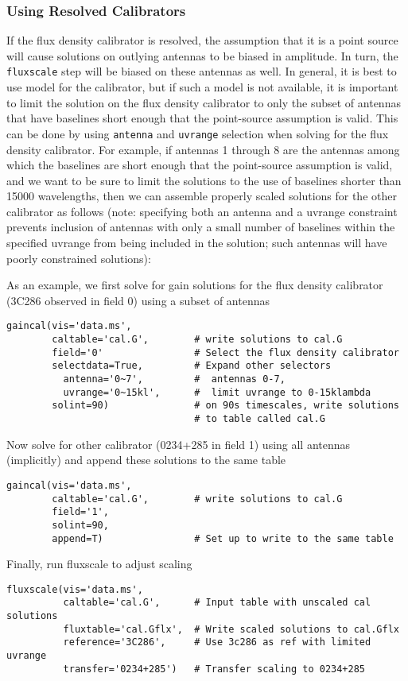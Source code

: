 \subsubsection{Using Resolved Calibrators}
\label{section:cal.solve.fluxscale.resolved}

If the flux density calibrator is resolved, the assumption that it is
a point source will cause solutions on outlying antennas to be biased
in amplitude.  In turn, the {\tt fluxscale} step will be biased
on these antennas as well.  In general, it is best to use 
model for the calibrator, but if such a model is not available,
it is important to limit the solution on the flux density calibrator
to only the subset of antennas that have baselines short enough that
the point-source assumption is valid.  This can be done by using
{\tt antenna} and {\tt uvrange} selection when solving for the flux density
calibrator.  For example, if antennas 1 through 8 are the antennas
among which the baselines are short enough that the point-source
assumption is valid, and we want to be sure to limit the solutions to
the use of baselines shorter than 15000 wavelengths, then we can
assemble properly scaled solutions for the other calibrator as follows
(note: specifying both an antenna and a uvrange constraint prevents
inclusion of antennas with only a small number of baselines within the
specified uvrange from being included in the solution; such antennas
will have poorly constrained solutions):

As an example, we first solve for gain solutions for the flux density
calibrator (3C286 observed in field 0) using a subset of antennas
\small
\begin{verbatim}
gaincal(vis='data.ms',
        caltable='cal.G',        # write solutions to cal.G
        field='0'                # Select the flux density calibrator
        selectdata=True,         # Expand other selectors
          antenna='0~7',         #  antennas 0-7,
          uvrange='0~15kl',      #  limit uvrange to 0-15klambda
        solint=90)               # on 90s timescales, write solutions
                                 # to table called cal.G
\end{verbatim}
\normalsize
Now solve for other calibrator (0234+285 in field 1) using all antennas
(implicitly) and append these solutions to the same table
\small
\begin{verbatim}
gaincal(vis='data.ms',
        caltable='cal.G',        # write solutions to cal.G
        field='1',
        solint=90,
        append=T)                # Set up to write to the same table
\end{verbatim}
\normalsize
Finally, run fluxscale to adjust scaling
\small
\begin{verbatim}
fluxscale(vis='data.ms',
          caltable='cal.G',      # Input table with unscaled cal solutions
          fluxtable='cal.Gflx',  # Write scaled solutions to cal.Gflx
          reference='3C286',     # Use 3c286 as ref with limited uvrange
          transfer='0234+285')   # Transfer scaling to 0234+285
\end{verbatim}
\normalsize

